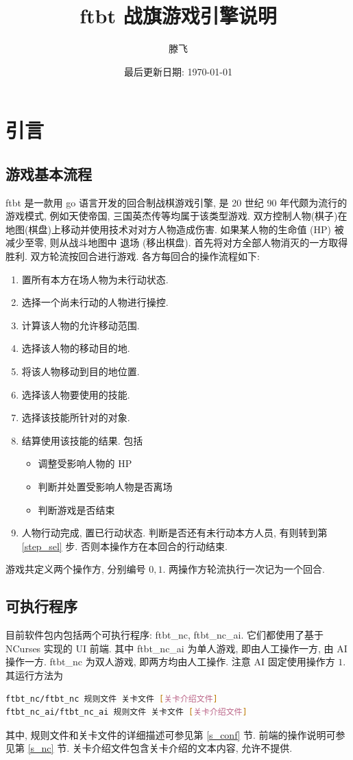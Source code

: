 \documentclass[UTF8, zihao=-4]{ctexart} %
\title{ftbt 战旗游戏引擎说明}
\date{最后更新日期: \today}
\author{滕飞}
\begin{document}
\maketitle

\section{引言}
\subsection{游戏基本流程}
\label{s_intro}
ftbt 是一款用 go 语言开发的回合制战棋游戏引擎, 是 20 世纪 90 年代颇为流行的游戏模式, 例如天使帝国, 三国英杰传等均属于该类型游戏. 
双方控制人物(棋子)在地图(棋盘)上移动并使用技术对对方人物造成伤害. 如果某人物的生命值 (HP) 被减少至零, 则从战斗地图中
退场 (移出棋盘). 首先将对方全部人物消灭的一方取得胜利. 双方轮流按回合进行游戏. 各方每回合的操作流程如下: 
\begin{enumerate}
      \item 置所有本方在场人物为未行动状态.
      \item \label{step_sel}选择一个尚未行动的人物进行操控.
      \item 计算该人物的允许移动范围.
      \item \label{step_move}选择该人物的移动目的地.
      \item 将该人物移动到目的地位置.
      \item \label{step_tech}选择该人物要使用的技能.
      \item \label{step_obj}选择该技能所针对的对象.
      \item 结算使用该技能的结果. 包括
            \begin{itemize}
                  \item 调整受影响人物的 HP
                  \item 判断并处置受影响人物是否离场
                  \item 判断游戏是否结束
            \end{itemize}
      \item 人物行动完成, 置已行动状态. 判断是否还有未行动本方人员, 有则转到第 \ref{step_sel} 步. 否则本操作方在本回合的行动结束.
\end{enumerate}
游戏共定义两个操作方, 分别编号 $0, 1$. 两操作方轮流执行一次记为一个回合.

\subsection{可执行程序}
\label{s_exec}
目前软件包内包括两个可执行程序: ftbt\_nc, ftbt\_nc\_ai. 
它们都使用了基于 NCurses 实现的 UI 前端. 其中 ftbt\_nc\_ai 为单人游戏, 即由人工操作一方, 由 AI 操作一方.
ftbt\_nc 为双人游戏, 即两方均由人工操作. 注意 AI 固定使用操作方 $1$.
其运行方法为
\begin{lstlisting}[language=bash]
ftbt_nc/ftbt_nc 规则文件 关卡文件 [关卡介绍文件]
ftbt_nc_ai/ftbt_nc_ai 规则文件 关卡文件 [关卡介绍文件]
\end{lstlisting}
其中, 规则文件和关卡文件的详细描述可参见第 \ref{s_conf} 节. 前端的操作说明可参见第 \ref{s_nc} 节.
关卡介绍文件包含关卡介绍的文本内容, 允许不提供.
\end{document}

